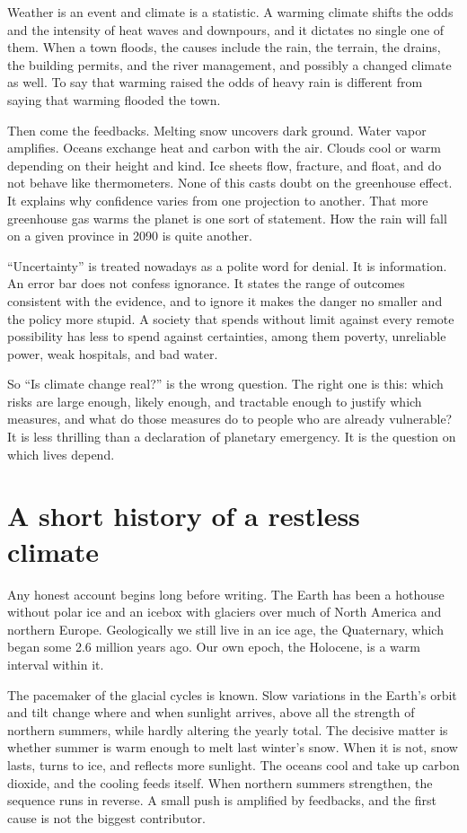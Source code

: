 \documentclass[12pt,a4paper]{book}
\begin{document}
Weather is an event and climate is a statistic. A warming climate shifts the odds and the intensity of heat waves and downpours, and it dictates no single one of them. When a town floods, the causes include the rain, the terrain, the drains, the building permits, and the river management, and possibly a changed climate as well. To say that warming raised the odds of heavy rain is different from saying that warming flooded the town.

Then come the feedbacks. Melting snow uncovers dark ground. Water vapor amplifies. Oceans exchange heat and carbon with the air. Clouds cool or warm depending on their height and kind. Ice sheets flow, fracture, and float, and do not behave like thermometers. None of this casts doubt on the greenhouse effect. It explains why confidence varies from one projection to another. That more greenhouse gas warms the planet is one sort of statement. How the rain will fall on a given province in 2090 is quite another.

``Uncertainty'' is treated nowadays as a polite word for denial. It is information. An error bar does not confess ignorance. It states the range of outcomes consistent with the evidence, and to ignore it makes the danger no smaller and the policy more stupid. A society that spends without limit against every remote possibility has less to spend against certainties, among them poverty, unreliable power, weak hospitals, and bad water.

So ``Is climate change real?'' is the wrong question. The right one is this: which risks are large enough, likely enough, and tractable enough to justify which measures, and what do those measures do to people who are already vulnerable? It is less thrilling than a declaration of planetary emergency. It is the question on which lives depend.

\section{A short history of a restless climate}

Any honest account begins long before writing. The Earth has been a hothouse without polar ice and an icebox with glaciers over much of North America and northern Europe. Geologically we still live in an ice age, the Quaternary, which began some 2.6 million years ago. Our own epoch, the Holocene, is a warm interval within it.

The pacemaker of the glacial cycles is known. Slow variations in the Earth's orbit and tilt change where and when sunlight arrives, above all the strength of northern summers, while hardly altering the yearly total. The decisive matter is whether summer is warm enough to melt last winter's snow. When it is not, snow lasts, turns to ice, and reflects more sunlight. The oceans cool and take up carbon dioxide, and the cooling feeds itself. When northern summers strengthen, the sequence runs in reverse. A small push is amplified by feedbacks, and the first cause is not the biggest contributor.
\end{document}
